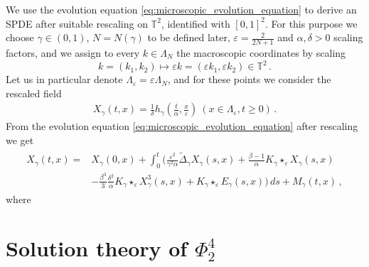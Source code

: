 \documentclass{report}
\newcommand{\TT}{\mathbb{T}}
\newcommand{\Convolve}[3][]{#2 \star_{#1} #3}
\theoremstyle{remark}
\theoremstyle{definition}
\let\epsilon\varepsilon
\begin{document}
We use the evolution equation \eqref{eq:microscopic_evolution_equation} to derive an SPDE after suitable rescaling on $\TT^2$, identified with $[0, 1]^2$. For this purpose we choose $\gamma \in (0, 1)$, $N = N(\gamma)$ to be defined later, $\epsilon = \frac{2}{2N + 1}$ and $\alpha, \delta > 0$ scaling factors, and we assign to every $k \in \Lambda_N$ the macroscopic coordinates by scaling $$k = (k_1, k_2) \mapsto \epsilon k =(\epsilon k_1, \epsilon k_2) \in \TT^2\,.$$ Let us in particular denote $\Lambda_\epsilon = \epsilon \Lambda_N$, and for these points we consider the rescaled field
\begin{align}
  X_\gamma(t, x) = \frac{1}{\delta}h_\gamma\left(\frac{t}{\alpha}, \frac{x}{\epsilon}\right)~(x\in \Lambda_\epsilon, t \ge 0)\,.
\end{align}
From the evolution equation \eqref{eq:microscopic_evolution_equation} after rescaling we get
\begin{align}
  \begin{split}
      X_\gamma(t, x) =& X_\gamma(0, x) + \int_{0}^{t} \biggl(\frac{\epsilon^2}{\gamma^2 \alpha}\tilde{\Delta}_\gamma X_\gamma(s, x) + \frac{\beta - 1}{\alpha} \Convolve[\epsilon]{K_\gamma}{X_\gamma(s, x)}\\
    &-\frac{\beta^3}{3} \frac{\delta^2}{\alpha} \Convolve[\epsilon]{K_\gamma}{X_\gamma^3(s, x)} + \Convolve[\epsilon]{K_\gamma}{E_\gamma(s, x)}\biggr)\,ds + M_\gamma(t, x)\,,
  \end{split}
\end{align}
where 
\section{Solution theory of $\Phi^4_2$}
\end{document}
